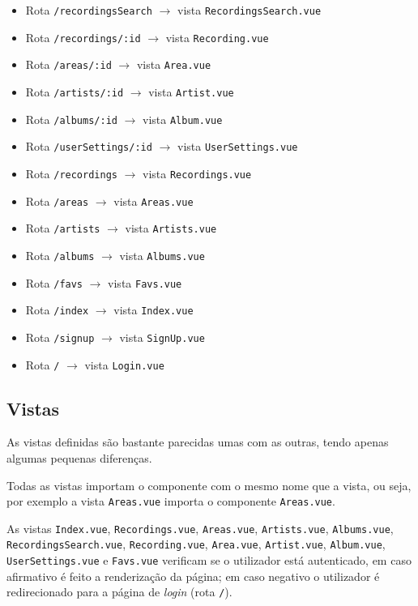\documentclass{article}
\begin{document}
\begin{itemize}
    \item Rota \texttt{/recordingsSearch} $\to$ vista \texttt{RecordingsSearch.vue}
    \item Rota \texttt{/recordings/:id} $\to$ vista \texttt{Recording.vue}
    \item Rota \texttt{/areas/:id} $\to$ vista \texttt{Area.vue}
    \item Rota \texttt{/artists/:id} $\to$ vista \texttt{Artist.vue}
    \item Rota \texttt{/albums/:id} $\to$ vista \texttt{Album.vue}
    \item Rota \texttt{/userSettings/:id} $\to$ vista \texttt{UserSettings.vue}
    \item Rota \texttt{/recordings} $\to$ vista \texttt{Recordings.vue}
    \item Rota \texttt{/areas} $\to$ vista \texttt{Areas.vue}
    \item Rota \texttt{/artists} $\to$ vista \texttt{Artists.vue}
    \item Rota \texttt{/albums} $\to$ vista \texttt{Albums.vue}
    \item Rota \texttt{/favs} $\to$ vista \texttt{Favs.vue}
    \item Rota \texttt{/index} $\to$ vista \texttt{Index.vue}
    \item Rota \texttt{/signup} $\to$ vista \texttt{SignUp.vue}
    \item Rota \texttt{/} $\to$ vista \texttt{Login.vue}
\end{itemize}

\subsection{Vistas}

As vistas definidas são bastante parecidas umas com as outras, tendo apenas algumas pequenas diferenças. 

Todas as vistas importam o componente com o mesmo nome que a vista, ou seja, por exemplo a vista \texttt{Areas.vue} importa o componente \texttt{Areas.vue}.

As vistas \texttt{Index.vue}, \texttt{Recordings.vue}, \texttt{Areas.vue}, \texttt{Artists.vue}, \texttt{Albums.vue}, \texttt{RecordingsSearch.vue}, \texttt{Recording.vue}, \texttt{Area.vue}, \texttt{Artist.vue}, \texttt{Album.vue}, \texttt{UserSettings.vue} e \texttt{Favs.vue} verificam se o utilizador está autenticado, em caso afirmativo é feito a renderização da página; em caso negativo o utilizador é redirecionado para a página de \textit{login} (rota \texttt{/}).
\end{document}
